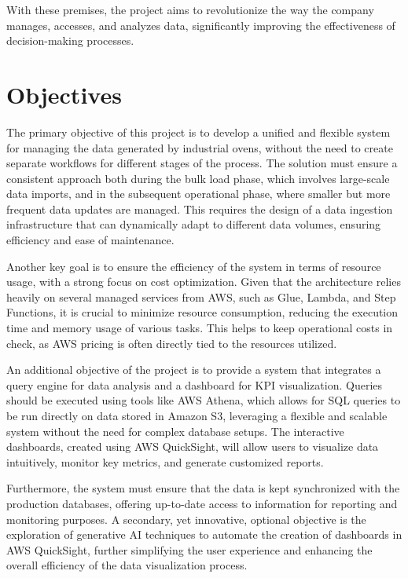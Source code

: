 With these premises, the project aims to revolutionize the way the company manages, accesses, and analyzes data, significantly improving the effectiveness of decision-making processes.


\section{Objectives}
The primary objective of this project is to develop a unified and flexible system for managing the data generated by industrial ovens, without the need to create separate workflows for different stages of the process. The solution must ensure a consistent approach both during the bulk load phase, which involves large-scale data imports, and in the subsequent operational phase, where smaller but more frequent data updates are managed. This requires the design of a data ingestion infrastructure that can dynamically adapt to different data volumes, ensuring efficiency and ease of maintenance.

Another key goal is to ensure the efficiency of the system in terms of resource usage, with a strong focus on cost optimization. Given that the architecture relies heavily on several managed services from \ac{AWS}, such as Glue, Lambda, and Step Functions, it is crucial to minimize resource consumption, reducing the execution time and memory usage of various tasks. This helps to keep operational costs in check, as \ac{AWS} pricing is often directly tied to the resources utilized.

An additional objective of the project is to provide a system that integrates a query engine for data analysis and a dashboard for \ac{KPI} visualization. Queries should be executed using tools like \ac{AWS} Athena, which allows for \ac{SQL} queries to be run directly on data stored in Amazon S3, leveraging a flexible and scalable system without the need for complex database setups. The interactive dashboards, created using \ac{AWS} QuickSight, will allow users to visualize data intuitively, monitor key metrics, and generate customized reports.

Furthermore, the system must ensure that the data is kept synchronized with the production databases, offering up-to-date access to information for reporting and monitoring purposes. A secondary, yet innovative, optional objective is the exploration of generative AI techniques to automate the creation of dashboards in \ac{AWS} QuickSight, further simplifying the user experience and enhancing the overall efficiency of the data visualization process.

